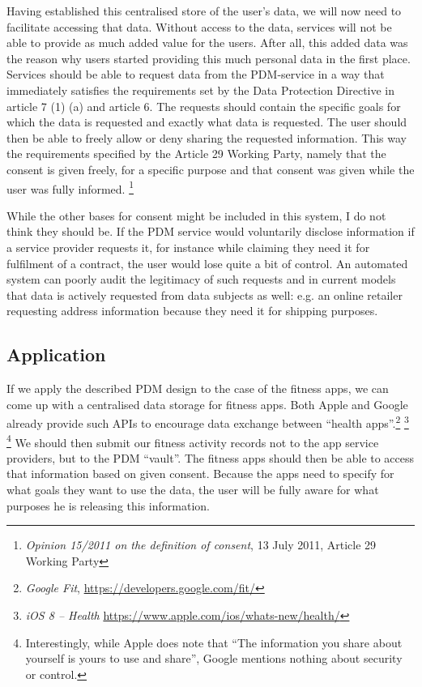 \documentclass{article}
\begin{document}
Having established this centralised store of the user's data, we will now need to facilitate accessing that data.
Without access to the data, services will not be able to provide as much added value for the users.
After all, this added data was the reason why users started providing this much personal data in the first place.
Services should be able to request data from the PDM-service in a way that immediately satisfies the requirements set by the Data Protection Directive in article 7 (1) (a) and article 6.
The requests should contain the specific goals for which the data is requested and exactly what data is requested.
The user should then be able to freely allow or deny sharing the requested information.
This way the requirements specified by the Article 29 Working Party, namely that the consent is given freely, for a specific purpose and that consent was given while the user was fully informed. \footnote{\emph{Opinion 15/2011 on the definition of consent}, 13 July 2011, Article 29 Working Party}

While the other bases for consent might be included in this system, I do not think they should be.
If the PDM service would voluntarily disclose information if a service provider requests it, for instance while claiming they need it for fulfilment of a contract, the user would lose quite a bit of control.
An automated system can poorly audit the legitimacy of such requests and in current models that data is actively requested from data subjects as well: e.g. an online retailer requesting address information because they need it for shipping purposes.

\subsection{Application}

If we apply the described PDM design to the case of the fitness apps, we can come up with a centralised data storage for fitness apps.
Both Apple and Google already provide such APIs to encourage data exchange between ``health apps''.\footnote{\emph{Google Fit}, \url{https://developers.google.com/fit/}} \footnote{\emph{iOS 8 -- Health} \url{https://www.apple.com/ios/whats-new/health/}} \footnote{Interestingly, while Apple does note that ``The information you share about yourself is yours to use and share'', Google mentions nothing about security or control.}
We should then submit our fitness activity records not to the app service providers, but to the PDM ``vault''.
The fitness apps should then be able to access that information based on given consent.
Because the apps need to specify for what goals they want to use the data, the user will be fully aware for what purposes he is releasing this information.
\end{document}
